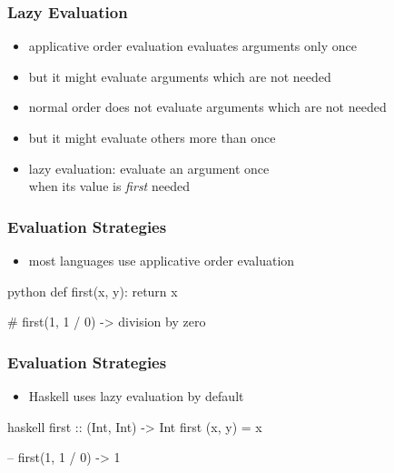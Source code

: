 \documentclass[dvipsnames]{beamer}
\theoremstyle{plain}
\begin{document}
\begin{frame}
  \frametitle{Lazy Evaluation}

  \begin{itemize}
    \item applicative order evaluation evaluates arguments only once
    \item but it might evaluate arguments which are not needed

    \pause
    \medskip
    \item normal order does not evaluate arguments which are not needed
    \item but it might evaluate others more than once

    \pause
    \medskip
    \item \alert{lazy evaluation}: evaluate an argument once\\
      when its value is \emph{first} needed
  \end{itemize}
\end{frame}

\begin{frame}[fragile]
  \frametitle{Evaluation Strategies}

  \begin{itemize}
    \item most languages use applicative order evaluation
  \end{itemize}

  \begin{example}[Python]
    \begin{pygments}{python}
def first(x, y):
    return x

# first(1, 1 / 0) -> division by zero
    \end{pygments}
  \end{example}
\end{frame}

\begin{frame}[fragile]
  \frametitle{Evaluation Strategies}

  \begin{itemize}
    \item Haskell uses lazy evaluation by default
  \end{itemize}

  \begin{example}[Haskell]
    \begin{pygments}{haskell}
first :: (Int, Int) -> Int
first (x, y) = x

-- first(1, 1 / 0) -> 1
    \end{pygments}
  \end{example}
\end{frame}
\end{document}
